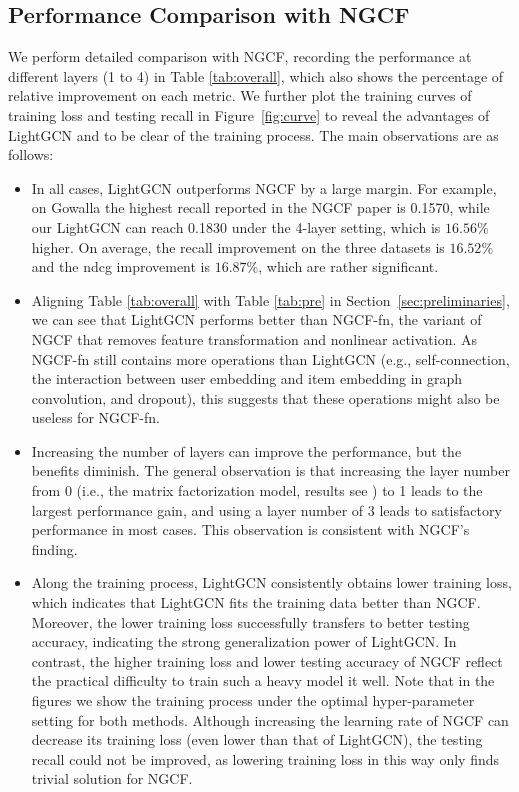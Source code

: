 \documentclass[sigconf]{acmart}
\theoremstyle{definition}
\begin{document}
\subsection{Performance Comparison with NGCF}\label{ss:exp-ngcf}
We perform detailed comparison with NGCF, recording the performance at different layers (1 to 4) in Table \ref{tab:overall}, which also shows the percentage of relative improvement on each metric. 
We further plot the training curves of training loss and testing recall in Figure~\ref{fig:curve} to reveal the advantages of LightGCN and to be clear of the training process. 
The main observations are as follows:
\begin{itemize}[leftmargin=*]
    \item In all cases, LightGCN outperforms NGCF by a large margin. For example, on Gowalla the highest recall reported in the NGCF paper is 0.1570, while our LightGCN can reach 0.1830 under the 4-layer setting, which is $16.56\%$ higher. On average, the recall improvement on the three datasets is $16.52\%$ and the ndcg improvement is $16.87\%$, which are rather significant.
    \item Aligning Table \ref{tab:overall} with Table \ref{tab:pre} in Section~\ref{sec:preliminaries}, we can see that LightGCN performs better than NGCF-fn, the variant of NGCF that removes feature transformation and nonlinear activation. As NGCF-fn still contains more operations than LightGCN (e.g., self-connection, the interaction between user embedding and item embedding in graph convolution, and dropout), this suggests that these operations might also be useless for NGCF-fn. 
    \item Increasing the number of layers can improve the performance, but the benefits diminish. The general observation is that increasing the layer number from 0 (i.e., the matrix factorization model, results see \cite{NGCF}) to 1 leads to the largest performance gain, and using a layer number of 3 leads to satisfactory performance in most cases. This observation is consistent with NGCF's finding.
\item Along the training process, LightGCN consistently obtains lower training loss, which indicates that LightGCN fits the training data better than NGCF. Moreover, the lower training loss successfully transfers to better testing accuracy, indicating the strong generalization power of LightGCN. In contrast, the higher training loss and lower testing accuracy of NGCF reflect the practical difficulty to train such a heavy model it well. Note that in the figures we show the training process under the optimal hyper-parameter setting for both methods. Although increasing the learning rate of NGCF can decrease its training loss (even lower than that of LightGCN), the testing recall could not be improved, as lowering training loss in this way only finds trivial solution for NGCF. 
\end{itemize}
\end{document}
